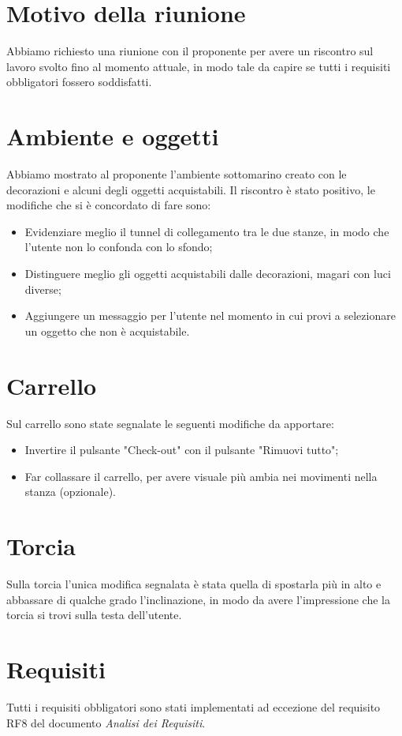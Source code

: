 \section{Motivo della riunione}
Abbiamo richiesto una riunione con il proponente per avere un riscontro sul lavoro svolto fino al momento attuale, 
in modo tale da capire se tutti i requisiti obbligatori fossero soddisfatti.

\section{Ambiente e oggetti}
Abbiamo mostrato al proponente l'ambiente sottomarino creato con le decorazioni e alcuni degli oggetti acquistabili. 
Il riscontro è stato positivo, le modifiche che si è concordato di fare sono:
\begin{itemize}
    \item Evidenziare meglio il tunnel di collegamento tra le due stanze, in modo che l'utente non lo confonda con lo sfondo;
    \item Distinguere meglio gli oggetti acquistabili dalle decorazioni, magari con luci diverse;
    \item Aggiungere un messaggio per l'utente nel momento in cui provi a selezionare un oggetto che non è acquistabile.
\end{itemize}

\section{Carrello}
Sul carrello sono state segnalate le seguenti modifiche da apportare:
\begin{itemize}
    \item Invertire il pulsante "Check-out" con il pulsante "Rimuovi tutto";
    \item Far collassare il carrello, per avere visuale più ambia nei movimenti nella stanza (opzionale).
\end{itemize}

\section{Torcia}
Sulla torcia l'unica modifica segnalata è stata quella di spostarla più in alto e abbassare di qualche grado l'inclinazione, 
in modo da avere l'impressione che la torcia si trovi sulla testa dell'utente.

\section{Requisiti}
Tutti i requisiti obbligatori sono stati implementati ad eccezione del requisito RF8 del documento \textit{Analisi dei Requisiti}.